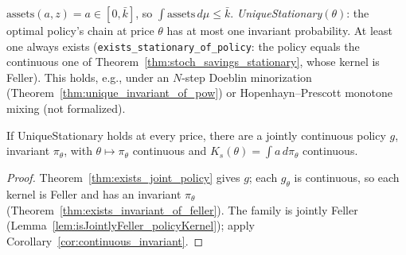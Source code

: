 \begin{definition}
\label{def:unique_stationary}
\leanok
{}
$\mathrm{assets}(a,z) = a \in [0,\bar k]$, so $\int \mathrm{assets}\,d\mu \le \bar k$. \emph{UniqueStationary}$(\theta)$:
the optimal policy's chain at price $\theta$ has at most one invariant probability. At least one always
exists (\texttt{exists\_stationary\_of\_policy}: the policy equals the continuous one of
Theorem~\ref{thm:stoch_savings_stationary}, whose kernel is Feller). This holds, e.g., under an
$N$-step Doeblin minorization (Theorem~\ref{thm:unique_invariant_of_pow}) or Hopenhayn--Prescott monotone
mixing (not formalized).
\end{definition}

\begin{theorem}
\label{thm:continuous_aggregate}
\leanok
{}
If UniqueStationary holds at every price, there are a jointly continuous policy $g$, invariant $\pi_\theta$, with
$\theta\mapsto\pi_\theta$ continuous and $K_s(\theta) = \int a\,d\pi_\theta$ continuous.
\end{theorem}
\begin{proof}
\leanok
{}
Theorem~\ref{thm:exists_joint_policy} gives $g$; each $g_\theta$ is continuous, so each kernel is Feller and has
an invariant $\pi_\theta$ (Theorem~\ref{thm:exists_invariant_of_feller}). The family is jointly Feller
(Lemma~\ref{lem:isJointlyFeller_policyKernel}); apply Corollary~\ref{cor:continuous_invariant}.
\end{proof}

